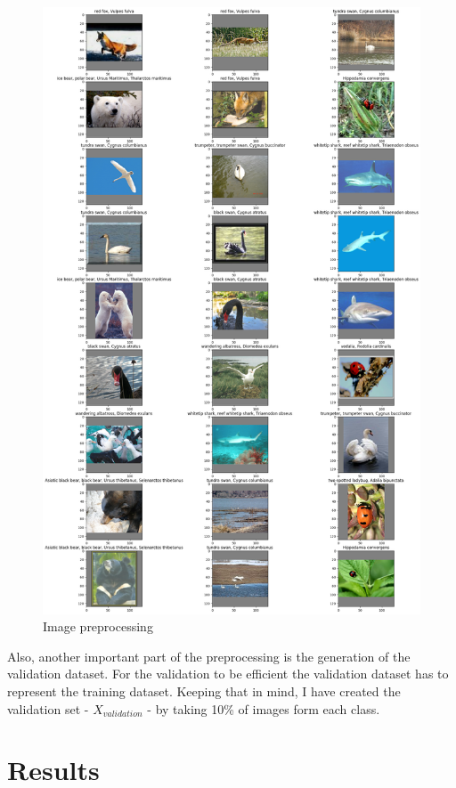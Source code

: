 \documentclass[times, utf8, diplomski]{fer}
\begin{document}
 
\begin{figure}
  \includegraphics[scale=0.36]{figures/preprocessing_images.png}
  \centering
  \caption{Image preprocessing}
  \label{fig:preprocessing_images}
\end{figure}

Also, another important part of the preprocessing is the generation of the validation dataset. For the validation to be efficient the validation dataset has to represent the training dataset. Keeping that in mind, I have created the validation set - $X_{validation}$ - by taking 10\% of images form each class.

\chapter{Results}
\end{document}
